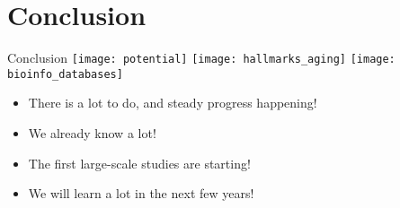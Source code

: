 \section{Conclusion}




\begin{frame}[c]{Conclusion}
    \texttt{[image: potential]}
    \texttt{[image: hallmarks\_aging]}
    \texttt{[image: bioinfo\_databases]} \\

    \large
    \begin{itemize}[<+(1)->]
        \item There is a lot to do, and steady progress happening!
        \item We already know a lot!
        \item The first large-scale studies are starting!
        \item We will learn a lot in the next few years!
    \end{itemize}
\end{frame}
